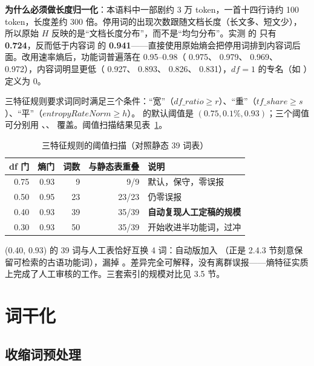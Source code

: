\textbf{为什么必须做长度归一化}：本语料中一部剧约 3 万 token，一首十四行诗约 100 token，长度差约 300 倍。停用词的出现次数跟随文档长度（长文多、短文少），所以原始 $H$ 反映的是“文档长度分布”，而不是“均匀分布”。实测  的  只有 \textbf{0.724}，反而低于内容词  的 \textbf{0.941}——直接使用原始熵会把停用词排到内容词后面。改用速率熵后，功能词普遍落在 0.95--0.98（ 0.975、 0.979、 0.969、 0.972），内容词明显更低（ 0.927、 0.893、 0.826、 0.831），$df=1$ 的专名（如 ）定义为 0。

三特征规则要求词同时满足三个条件：“宽”（$df\_ratio \ge r$）、“重”（$tf\_share \ge s$）、“平”（$\mathit{entropyRateNorm} \ge h$）。 的默认阈值是 $(0.75, 0.1\%, 0.93)$；三个阈值可分别用 、、 覆盖。阈值扫描结果见表~\ref{tab:entropy-rule}。

\begin{table}[htbp]
  \centering
  \caption{三特征规则的阈值扫描（对照静态 39 词表）}
  \label{tab:entropy-rule}
  \small
  \begin{tabularx}{\linewidth}{@{}r r r r X@{}}
    \toprule
    df 门 & 熵门 & 词数 & 与静态表重叠 & 说明 \\
    \midrule
    0.75 & 0.93 & 9  & 9/9   & 默认，保守，零误报 \\
    0.50 & 0.95 & 23 & 23/23 & 仍零误报 \\
    0.40 & 0.93 & 39 & 35/39 & \textbf{自动复现人工定稿的规模} \\
    0.30 & 0.93 & 50 & 35/39 & 开始收进半功能词，过冲 \\
    \bottomrule
  \end{tabularx}
\end{table}

(0.40, 0.93) 的 39 词与人工表恰好互换 4 词：自动版加入 （正是 2.4.3 节刻意保留可检索的古语功能词），漏掉 。差异完全可解释，没有离群误报——熵特征实质上完成了人工审核的工作。三套索引的规模对比见 3.5 节。

\section{词干化}

\subsection{收缩词预处理}

